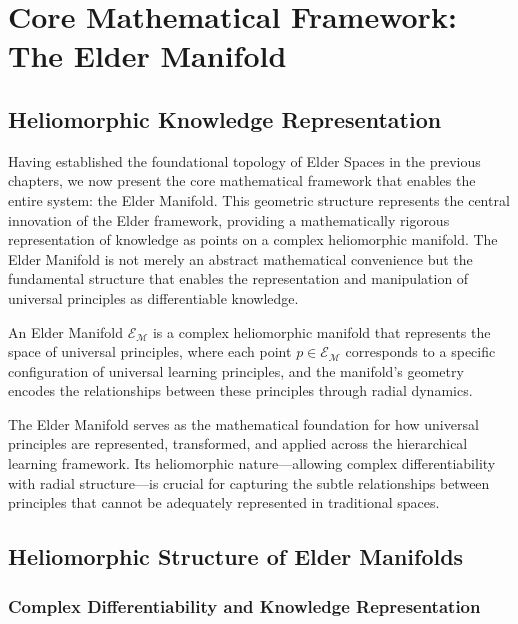 \chapter{Core Mathematical Framework: The Elder Manifold}

\section{Heliomorphic Knowledge Representation}

Having established the foundational topology of Elder Spaces in the previous chapters, we now present the core mathematical framework that enables the entire system: the Elder Manifold. This geometric structure represents the central innovation of the Elder framework, providing a mathematically rigorous representation of knowledge as points on a complex heliomorphic manifold. The Elder Manifold is not merely an abstract mathematical convenience but the fundamental structure that enables the representation and manipulation of universal principles as differentiable knowledge.

\begin{definition}
An Elder Manifold $\mathcal{E}_{\mathcal{M}}$ is a complex heliomorphic manifold that represents the space of universal principles, where each point $p \in \mathcal{E}_{\mathcal{M}}$ corresponds to a specific configuration of universal learning principles, and the manifold's geometry encodes the relationships between these principles through radial dynamics.
\end{definition}

The Elder Manifold serves as the mathematical foundation for how universal principles are represented, transformed, and applied across the hierarchical learning framework. Its heliomorphic nature—allowing complex differentiability with radial structure—is crucial for capturing the subtle relationships between principles that cannot be adequately represented in traditional spaces.

\section{Heliomorphic Structure of Elder Manifolds}

\subsection{Complex Differentiability and Knowledge Representation}

